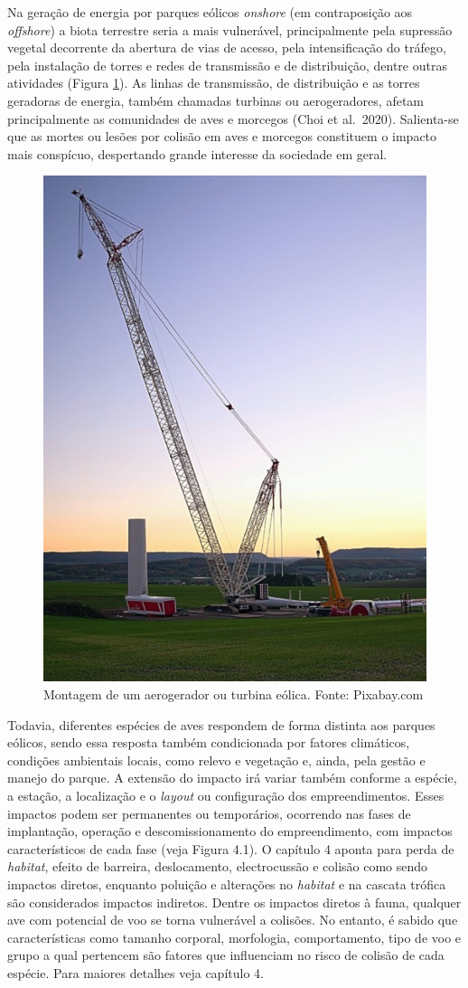 \documentclass[
  oneside]{scrbook}
\begin{document}
Na geração de energia por parques eólicos \emph{onshore} (em contraposição aos \emph{offshore}) a biota terrestre seria a mais vulnerável, principalmente pela supressão vegetal decorrente da abertura de vias de acesso, pela intensificação do tráfego, pela instalação de torres e redes de transmissão e de distribuição, dentre outras atividades (Figura \ref{fig:18}). As linhas de transmissão, de distribuição e as torres geradoras de energia, também chamadas turbinas ou aerogeradores, afetam principalmente as comunidades de aves e morcegos (Choi et al.~2020). Salienta-se que as mortes ou lesões por colisão em aves e morcegos constituem o impacto mais conspícuo, despertando grande interesse da sociedade em geral.

\begin{figure}[H]

{\centering \includegraphics[width=0.5\linewidth]{imagens/cap06/Figura_6.1} 

}

\caption{Montagem de um aerogerador ou turbina eólica. Fonte: Pixabay.com}\label{fig:18}
\end{figure}

Todavia, diferentes espécies de aves respondem de forma distinta aos parques eólicos, sendo essa resposta também condicionada por fatores climáticos, condições ambientais locais, como relevo e vegetação e, ainda, pela gestão e manejo do parque. A extensão do impacto irá variar também conforme a espécie, a estação, a localização e o \emph{layout} ou configuração dos empreendimentos. Esses impactos podem ser permanentes ou temporários, ocorrendo nas fases de implantação, operação e descomissionamento do empreendimento, com impactos característicos de cada fase (veja Figura 4.1). O capítulo 4 aponta para perda de \emph{habitat}, efeito de barreira, deslocamento, electrocussão e colisão como sendo impactos diretos, enquanto poluição e alterações no \emph{habitat} e na cascata trófica são considerados impactos indiretos. Dentre os impactos diretos à fauna, qualquer ave com potencial de voo se torna vulnerável a colisões. No entanto, é sabido que características como tamanho corporal, morfologia, comportamento, tipo de voo e grupo a qual pertencem são fatores que influenciam no risco de colisão de cada espécie. Para maiores detalhes veja capítulo 4.
\end{document}
